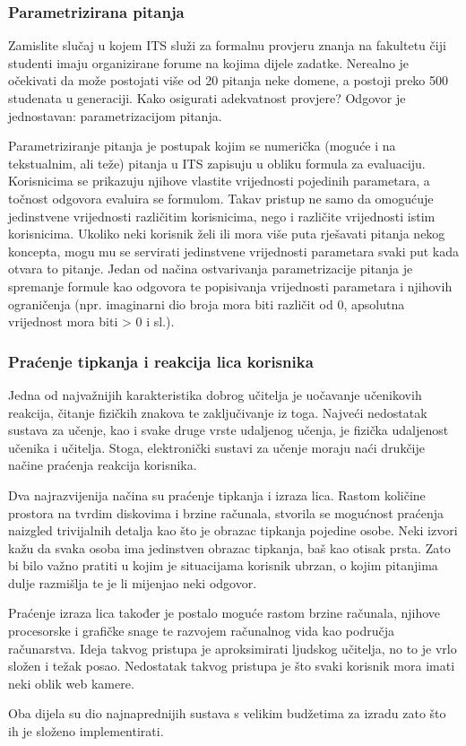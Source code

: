 \documentclass[times, utf8, zavrsni, numeric]{fer}
\begin{document}
\subsubsection{Parametrizirana pitanja}
Zamislite slučaj u kojem ITS služi za formalnu provjeru znanja na fakultetu čiji studenti imaju organizirane forume na kojima dijele zadatke. Nerealno je očekivati da može postojati više od 20 pitanja neke domene, a postoji preko 500 studenata u generaciji. Kako osigurati adekvatnost provjere? Odgovor je jednostavan: parametrizacijom pitanja.
\par
Parametriziranje pitanja je postupak kojim se numerička (moguće i na tekstualnim, ali teže) pitanja u ITS zapisuju u obliku formula za evaluaciju. Korisnicima se prikazuju njihove vlastite vrijednosti pojedinih parametara, a točnost odgovora evaluira se formulom. Takav pristup ne samo da omogućuje jedinstvene vrijednosti različitim korisnicima, nego i različite vrijednosti istim korisnicima. Ukoliko neki korisnik želi ili mora više puta rješavati pitanja nekog koncepta, mogu mu se servirati jedinstvene vrijednosti parametara svaki put kada otvara to pitanje. Jedan od načina ostvarivanja parametrizacije pitanja je spremanje formule kao odgovora te popisivanja vrijednosti parametara i njihovih ograničenja (npr. imaginarni dio broja mora biti različit od 0, apsolutna vrijednost mora biti > 0 i sl.).

\subsubsection{Praćenje tipkanja i reakcija lica korisnika}
Jedna od najvažnijih karakteristika dobrog učitelja je uočavanje učenikovih reakcija, čitanje fizičkih znakova te zaključivanje iz toga. Najveći nedostatak sustava za učenje, kao i svake druge vrste udaljenog učenja, je fizička udaljenost učenika i učitelja. Stoga, elektronički sustavi za učenje moraju naći drukčije načine praćenja reakcija korisnika.
\par
Dva najrazvijenija načina su praćenje tipkanja i izraza lica. Rastom količine prostora na tvrdim diskovima i brzine računala, stvorila se mogućnost praćenja naizgled trivijalnih detalja kao što je obrazac tipkanja pojedine osobe. Neki izvori kažu da svaka osoba ima jedinstven obrazac tipkanja, baš kao otisak prsta. Zato bi bilo važno pratiti u kojim je situacijama korisnik ubrzan, o kojim pitanjima dulje razmišlja te je li mijenjao neki odgovor.
\par
Praćenje izraza lica također je postalo moguće rastom brzine računala, njihove procesorske i grafičke snage te razvojem računalnog vida kao područja računarstva. Ideja takvog pristupa je aproksimirati ljudskog učitelja, no to je vrlo složen i težak posao. Nedostatak takvog pristupa je što svaki korisnik mora imati neki oblik web kamere.
\par
Oba dijela su dio najnaprednijih sustava s velikim budžetima za izradu zato što ih je složeno implementirati. 
\end{document}

